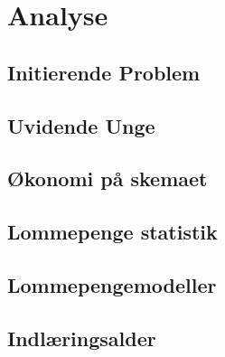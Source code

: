 





\chapter{Analyse}

\section{Initierende Problem}


\section{Uvidende Unge}
\label{UvidendeUnge}


\section{Økonomi på skemaet}


\section{Lommepenge statistik}


\section{Lommepengemodeller}


\section{Indlæringsalder}







